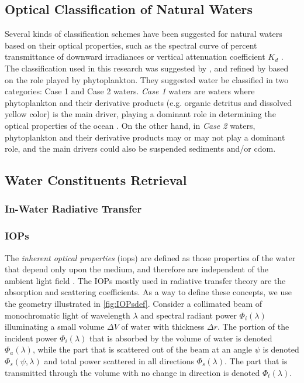 \subsection{Optical Classification of Natural Waters}

Several kinds of classification schemes have been suggested for natural waters based on their optical properties, such as the spectral curve of percent transmittance of downward irradiances or vertical attenuation coefficient $K_d$ \citep{Kirk1983}. The classification used in this research was suggested by \citet{Morel:1977rw}, and refined by \citet{GordonMorel1983} based on the role played by phytoplankton. They suggested water be classified in two categories: Case 1 and Case 2 waters. {\it Case 1} waters are waters where phytoplankton and their derivative products (e.g. organic detritus and dissolved yellow color) is the main driver, playing a dominant role in determining the optical properties of the ocean \citep{Kirk1983}. On the other hand, in {\it Case 2} waters, phytoplankton and their derivative products may or may not play a dominant role, and the main drivers could also be suspended sediments and/or \gls{cdom}.


\subsection{Water Constituents Retrieval}
\subsubsection{In-Water Radiative Transfer}
\subsubsection*{IOPs}
The {\it inherent optical properties} (\acrshort{iops}) are defined as those properties of the water that depend only upon the medium, and therefore are independent of the ambient light field \citep{Mobley:2001}. The IOPs mostly used in radiative transfer theory are the absorption and scattering coefficients. As a way to define these concepts, we use the geometry illustrated in \autoref{fig:IOPsdef}. Consider a collimated beam of monochromatic light of wavelength $\lambda$ and spectral radiant power $\Phi_i(\lambda)$ illuminating a small volume $\Delta V$ of water with thickness $\Delta r$. The portion of the incident power $\Phi_i(\lambda)$ that is absorbed by the volume of water is denoted $\Phi_a(\lambda)$, while the part that is scattered out of the beam at an angle $\psi$ is denoted $\Phi_s(\psi,\lambda)$ and total power scattered in all directions $\Phi_s(\lambda)$. The part that is transmitted through the volume with no change in direction is denoted $\Phi_t(\lambda)$. 

